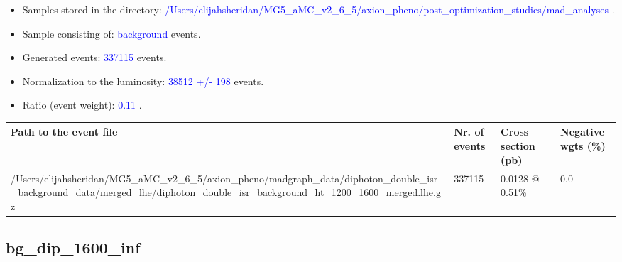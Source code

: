 \documentclass[a4paper, 10pt]{article}
\begin{document}
\begin{itemize}
  \item Samples stored in the directory: \textcolor{blue}{/\-Users/\-elijahsheridan/\-MG5\_aMC\_v2\_6\_5/\-axion\_pheno/\-post\_optimization\_studies/\-mad\_analyses} .
   \item Sample consisting of: \textcolor{blue}{background}  events.
   \item Generated events: \textcolor{blue}{337115 }  events.
   \item Normalization to the luminosity: \textcolor{blue}{38512}\textcolor{blue}{ +/\-- }\textcolor{blue}{198 }  events.
   \item Ratio (event weight): \textcolor{blue}{0.11 } .  
 
\end{itemize}
\begin{table}[H]
  \begin{center}
    \begin{tabular}{|m{55.0mm}|m{25.0mm}|m{30.0mm}|m{30.0mm}|}
      \hline
      {\cellcolor{yellow}         Path to the event file}& {\cellcolor{yellow}         Nr. of events}& {\cellcolor{yellow}         Cross section (pb)}& {\cellcolor{yellow}         Negative wgts (\%)}\\
      \hline
      {\cellcolor{white}          /\-Users/\-elijahsheridan/\-MG5\_aMC\_v2\_6\_5/\-axion\_pheno/\-madgraph\_data/\-diphoton\_double\_isr\_background\_data/\-merged\_lhe/\-diphoton\_double\_isr\_background\_ht\_1200\_1600\_merged.lhe.gz}& {\cellcolor{white}          337115}& {\cellcolor{white}          0.0128 @ 0.51\%}& {\cellcolor{white}          0.0}\\
\hline
    \end{tabular}
  \end{center}
\end{table}

\subsection{ bg\_dip\_1600\_inf}
\end{document}
